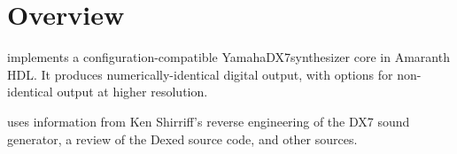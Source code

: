 
\chapter{Overview}

\projectname{ }implements a configuration-compatible Yamaha\textregistered{ }DX7\texttrademark{ }synthesizer core in Amaranth HDL.  It produces numerically-identical digital output, with options for non-identical output at higher resolution.

\projectname{ }uses information from Ken Shirriff's reverse engineering of the DX7 sound generator\autocites{Shirriff2021}{Shirriff2021a}{Shirriff2021b}{Shirriff2021c}{Shirriff2022}{Shirriff2022a}, a review of the Dexed source code\autocite{Gauthier2023}, and other sources.